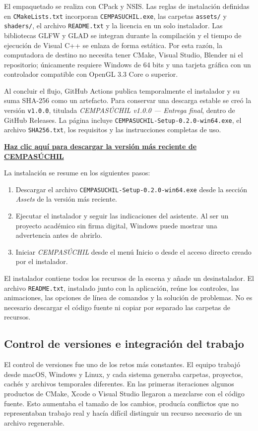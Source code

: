\documentclass[letter,12pt]{article}
\begin{document}
	El empaquetado se realiza con CPack y NSIS. Las reglas de instalación definidas en \texttt{CMakeLists.txt} incorporan \texttt{CEMPASUCHIL.exe}, las carpetas \texttt{assets/} y \texttt{shaders/}, el archivo \texttt{README.txt} y la licencia en un solo instalador. Las bibliotecas GLFW y GLAD se integran durante la compilación y el tiempo de ejecución de Visual C++ se enlaza de forma estática. Por esta razón, la computadora de destino no necesita tener CMake, Visual Studio, Blender ni el repositorio; únicamente requiere Windows de 64 bits y una tarjeta gráfica con un controlador compatible con OpenGL 3.3 Core o superior.

	Al concluir el flujo, GitHub Actions publica temporalmente el instalador y su suma SHA-256 como un artefacto. Para conservar una descarga estable se creó la versión \texttt{v1.0.0}, titulada \textit{CEMPASÚCHIL v1.0.0 --- Entrega final}, dentro de GitHub Releases. La página incluye \texttt{CEMPASUCHIL-Setup-0.2.0-win64.exe}, el archivo \texttt{SHA256.txt}, los requisitos y las instrucciones completas de uso.

	\begin{center}
		\large
		\textbf{\href{https://github.com/olveratrech/proyecto-final-cempasuchil/releases/latest}{Haz clic aquí para descargar la versión más reciente de CEMPASÚCHIL}}
	\end{center}

	La instalación se resume en los siguientes pasos:
	\begin{enumerate}[leftmargin=*]
		\item Descargar el archivo \texttt{CEMPASUCHIL-Setup-0.2.0-win64.exe} desde la sección \textit{Assets} de la versión más reciente.
		\item Ejecutar el instalador y seguir las indicaciones del asistente. Al ser un proyecto académico sin firma digital, Windows puede mostrar una advertencia antes de abrirlo.
		\item Iniciar \textit{CEMPASÚCHIL} desde el menú Inicio o desde el acceso directo creado por el instalador.
	\end{enumerate}
	El instalador contiene todos los recursos de la escena y añade un desinstalador. El archivo \texttt{README.txt}, instalado junto con la aplicación, reúne los controles, las animaciones, las opciones de línea de comandos y la solución de problemas. No es necesario descargar el código fuente ni copiar por separado las carpetas de recursos.

	\subsection{Control de versiones e integración del trabajo}
	El control de versiones fue uno de los retos más constantes. El equipo trabajó desde macOS, Windows y Linux, y cada sistema generaba carpetas, proyectos, cachés y archivos temporales diferentes. En las primeras iteraciones algunos productos de CMake, Xcode o Visual Studio llegaron a mezclarse con el código fuente. Esto aumentaba el tamaño de los cambios, producía conflictos que no representaban trabajo real y hacía difícil distinguir un recurso necesario de un archivo regenerable.
\end{document}
